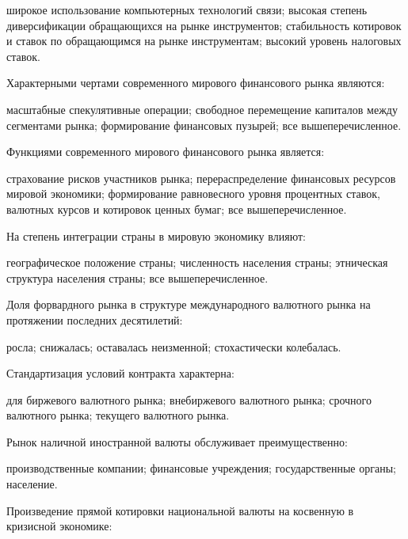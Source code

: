\documentclass[12pt, table]{exam}
\begin{document}
\begin{questions}
\begin{multicols}{2}
	 \begin{choices}
	 \choice широкое использование компьютерных технологий связи;
	 \CC высокая степень диверсификации обращающихся на рынке инструментов;
	 \choice стабильность котировок и ставок по обращающимся на рынке инструментам;
	 \choice высокий уровень налоговых ставок.
	 \end{choices}
\question Характерными чертами современного мирового финансового рынка являются:
	 \begin{choices}
	 \choice масштабные спекулятивные операции;
	 \choice свободное перемещение капиталов между сегментами рынка;
	 \CC формирование финансовых пузырей;
	 \choice все вышеперечисленное.
	 \end{choices}
\question Функциями современного мирового финансового рынка является:
	 \begin{choices}
	 \CC страхование рисков участников рынка;
	 \choice перераспределение финансовых ресурсов мировой экономики;
	 \choice формирование равновесного уровня процентных ставок, валютных курсов и котировок ценных бумаг;
	 \choice все вышеперечисленное.
	 \end{choices}
\question На степень интеграции страны в мировую экономику влияют:
	 \begin{choices}
	 \choice географическое положение страны;
	 \choice численность населения страны;
	 \choice этническая структура населения страны;
	 \CC все вышеперечисленное.
	 \end{choices}
\question Доля форвардного рынка в структуре международного валютного рынка на протяжении последних десятилетий:
	 \begin{choices}
	 \choice росла;
	 \CC снижалась;
	 \choice оставалась неизменной;
	 \choice стохастически колебалась.
	 \end{choices}
\question Стандартизация условий контракта характерна:
	 \begin{choices}
	 \choice для биржевого валютного рынка;
	 \CC внебиржевого валютного рынка;
	 \choice срочного валютного рынка;
	 \choice текущего валютного рынка.
	 \end{choices}
\question Рынок наличной иностранной валюты обслуживает преимущественно:
	 \begin{choices}
	 \choice производственные компании;
	 \CC финансовые учреждения;
	 \choice государственные органы;
	 \choice население.
	 \end{choices}
\question Произведение прямой котировки национальной валюты на косвенную в кризисной экономике:
	 \begin{choices}

\end{choices}
\end{multicols}
\end{questions}
\end{document}
